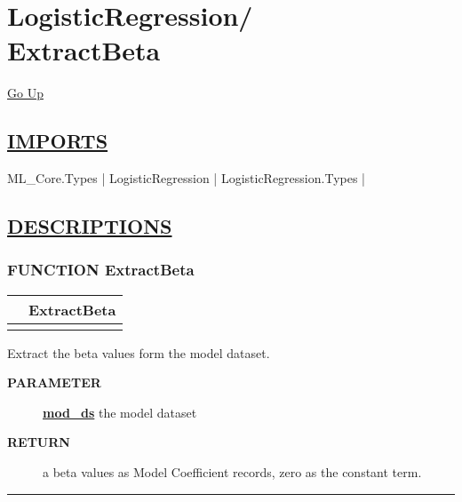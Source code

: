 \chapter*{\color{headfile}
{\large LogisticRegression\slash\hspace{0pt}}
 \\
ExtractBeta
}
\hypertarget{ecldoc:toc:LogisticRegression.ExtractBeta}{}
\hyperlink{ecldoc:toc:root/LogisticRegression}{Go Up}

\section*{\underline{\textsf{IMPORTS}}}
\begin{doublespace}
{\large
ML\_Core.Types |
LogisticRegression |
LogisticRegression.Types |
}
\end{doublespace}

\section*{\underline{\textsf{DESCRIPTIONS}}}
\subsection*{\textsf{\colorbox{headtoc}{\color{white} FUNCTION}
ExtractBeta}}

\hypertarget{ecldoc:logisticregression.extractbeta}{}

{\renewcommand{\arraystretch}{1.5}
\begin{tabularx}{\textwidth}{|>{\raggedright\arraybackslash}l|X|}
\hline
\hspace{0pt}\mytexttt{\color{red} } & \textbf{ExtractBeta} \\
\hline
\multicolumn{2}{|>{\raggedright\arraybackslash}X|}{\hspace{0pt}\mytexttt{\color{param} (DATASET(Core\_Types.Layout\_Model) mod\_ds)}} \\
\hline
\end{tabularx}
}

\par
Extract the beta values form the model dataset.

\par
\begin{description}
\item [\colorbox{tagtype}{\color{white} \textbf{\textsf{PARAMETER}}}] \textbf{\underline{mod\_ds}} the model dataset
\item [\colorbox{tagtype}{\color{white} \textbf{\textsf{RETURN}}}] \textbf{\underline{}} a beta values as Model Coefficient records, zero as the constant term.
\end{description}

\rule{\linewidth}{0.5pt}
